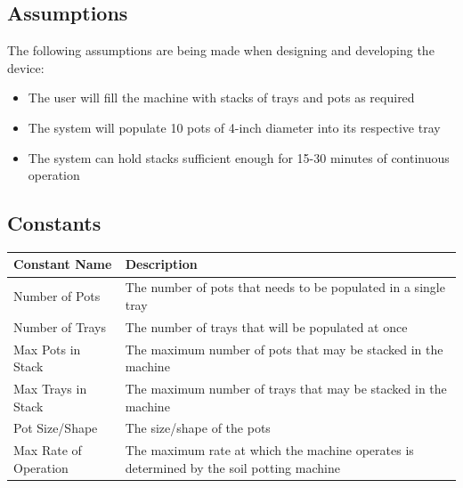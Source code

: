 \documentclass[12pt]{article}
\begin{document}
 \subsection{Assumptions}
 The following assumptions are being made when designing and developing 
  the device:
 \begin{itemize}
  
  \item The user will fill the machine with stacks of trays and 
  pots as required

  \item The system will populate 10 pots of 4-inch diameter into its 
  respective tray
  \item The system can hold stacks sufficient enough for 15-30 minutes of continuous operation
  
 \end{itemize}

 \subsection{Constants}
 \begin{tabular}{ |p{4cm}|p{12cm}| }
  \hline
  Constant Name & Description\\
  \hline
  Number of Pots & The number of pots that 
  needs to be populated in a single tray\\
  \hline
  Number of Trays & The number of trays that will be populated at once \\ 
  \hline  
  Max Pots in Stack & The maximum number of 
  pots that may be stacked in the machine\\
  \hline
  Max Trays in Stack & The maximum number of 
  trays that may be stacked in the machine\\
  \hline
  Pot Size/Shape & The size/shape of the pots\\
  \hline
  Max Rate of Operation & The maximum rate at which the machine operates 
  is determined by the soil potting machine \\
  \hline
 \end{tabular}\\\\
\end{document}
